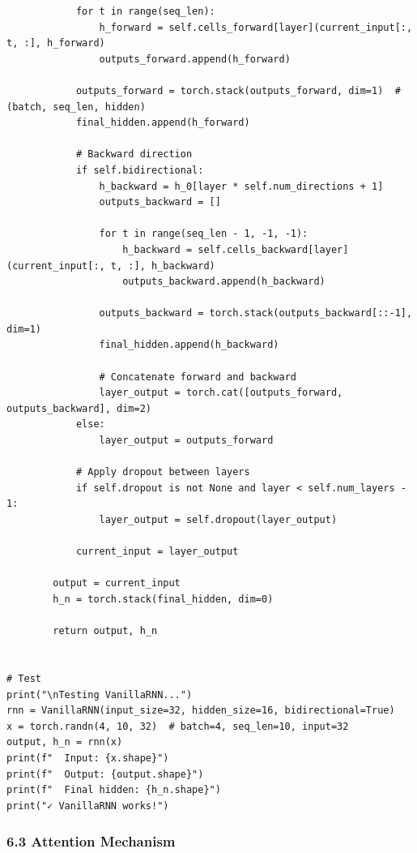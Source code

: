 \begin{lstlisting}
            for t in range(seq_len):
                h_forward = self.cells_forward[layer](current_input[:, t, :], h_forward)
                outputs_forward.append(h_forward)
 
            outputs_forward = torch.stack(outputs_forward, dim=1)  # (batch, seq_len, hidden)
            final_hidden.append(h_forward)
 
            # Backward direction
            if self.bidirectional:
                h_backward = h_0[layer * self.num_directions + 1]
                outputs_backward = []
 
                for t in range(seq_len - 1, -1, -1):
                    h_backward = self.cells_backward[layer](current_input[:, t, :], h_backward)
                    outputs_backward.append(h_backward)
 
                outputs_backward = torch.stack(outputs_backward[::-1], dim=1)
                final_hidden.append(h_backward)
 
                # Concatenate forward and backward
                layer_output = torch.cat([outputs_forward, outputs_backward], dim=2)
            else:
                layer_output = outputs_forward
 
            # Apply dropout between layers
            if self.dropout is not None and layer < self.num_layers - 1:
                layer_output = self.dropout(layer_output)
 
            current_input = layer_output
 
        output = current_input
        h_n = torch.stack(final_hidden, dim=0)
 
        return output, h_n
 
 
# Test
print("\nTesting VanillaRNN...")
rnn = VanillaRNN(input_size=32, hidden_size=16, bidirectional=True)
x = torch.randn(4, 10, 32)  # batch=4, seq_len=10, input=32
output, h_n = rnn(x)
print(f"  Input: {x.shape}")
print(f"  Output: {output.shape}")
print(f"  Final hidden: {h_n.shape}")
print("✓ VanillaRNN works!")
\end{lstlisting}
 
\subsubsection*{6.3 Attention Mechanism}
 
